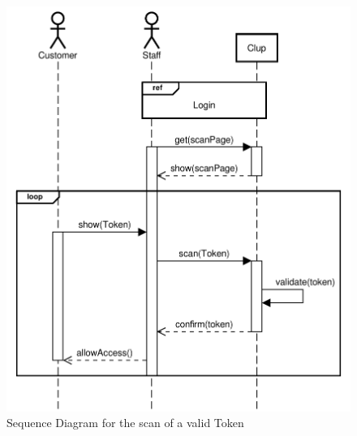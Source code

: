 \begin{figure}[H]
    \centering
    \includegraphics[scale=0.9]{Images/Sequence/scan-token_sequence_straight.pdf}
    \caption{Sequence Diagram for the scan of a valid Token}
\end{figure}
